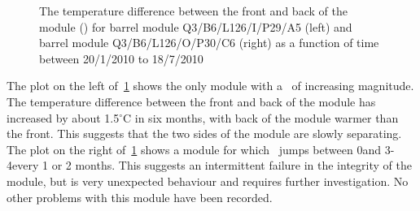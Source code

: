 \begin{figure}[h]
 	\centering
  \caption{The temperature difference between the front and back of the module
  (\deltat) for barrel module Q3/B6/L126/I/P29/A5 (left) and barrel module
  Q3/B6/L126/O/P30/C6 (right) as a function of time between 20/1/2010 to
  18/7/2010}
	\label{fig:pm_ev_dt}
\end{figure}

The plot on the left of~\ref{fig:pm_ev_dt} shows the only module with a \deltat\
of increasing magnitude. The temperature difference between the front and back
of the module has increased by about 1.5$^\circ$C in six months, with back of
the module warmer than the front. This suggests that the two sides of the module
are slowly separating. The plot on the right of~\ref{fig:pm_ev_dt} shows a
module for which \deltat\ jumps between 0\dc  and 3-4\dc every 1 or 2 months.
This suggests an intermittent failure in the integrity of the module, but is
very unexpected behaviour and requires further investigation. No other problems
with this module have been recorded.

